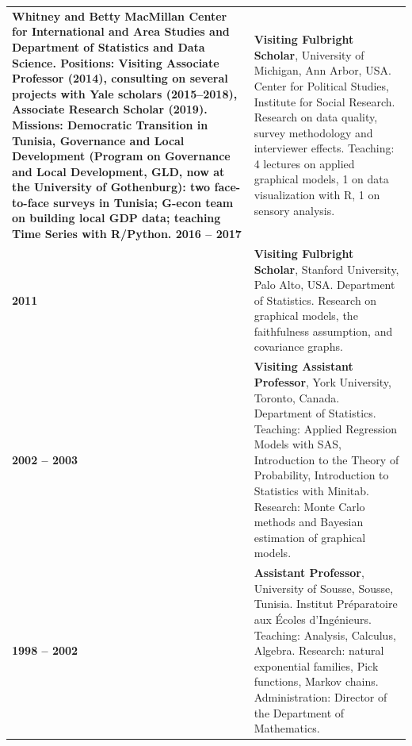 \documentclass[10pt,a4paper]{article}
\makeatletter
\newenvironment{cvdated}{%
  \begin{longtable}{@{}>{\raggedleft\arraybackslash\bfseries}p{3.35cm}@{\hspace{0.35cm}}p{\dimexpr\textwidth-3.7cm\relax}@{}}}%
  {\end{longtable}\vspace{-10pt}}
\newcommand{\cvrow}[2]{#1 & #2 \\[3pt]}
\makeatother
\begin{document}
\begin{cvdated}
{Whitney and Betty MacMillan Center for International and Area Studies and Department of Statistics and Data Science.\newline
Positions: Visiting Associate Professor (2014), consulting on several projects with Yale scholars (2015--2018),
Associate Research Scholar (2019).\newline
Missions: Democratic Transition in Tunisia, Governance and Local Development (Program on Governance and Local
Development, GLD, now at the University of Gothenburg): two face-to-face surveys in Tunisia; G-econ team on
building local GDP data; teaching Time Series with R/Python.}
\cvrow{2016 -- 2017}{\textbf{Visiting Fulbright Scholar}, University of Michigan, Ann Arbor, USA.\newline
Center for Political Studies, Institute for Social Research. Research on data quality, survey methodology and
interviewer effects. Teaching: 4 lectures on applied graphical models, 1 on data visualization with R, 1 on
sensory analysis.}
\cvrow{2011}{\textbf{Visiting Fulbright Scholar}, Stanford University, Palo Alto, USA.\newline
Department of Statistics. Research on graphical models, the faithfulness assumption, and covariance graphs.}
\cvrow{2002 -- 2003}{\textbf{Visiting Assistant Professor}, York University, Toronto, Canada.\newline
Department of Statistics. Teaching: Applied Regression Models with SAS, Introduction to the Theory of Probability,
Introduction to Statistics with Minitab. Research: Monte Carlo methods and Bayesian estimation of graphical models.}
\cvrow{1998 -- 2002}{\textbf{Assistant Professor}, University of Sousse, Sousse, Tunisia.\newline
Institut Pr\'eparatoire aux \'Ecoles d'Ing\'enieurs. Teaching: Analysis, Calculus, Algebra. Research: natural
exponential families, Pick functions, Markov chains. Administration: Director of the Department of Mathematics.}
\end{cvdated}

\end{document}
